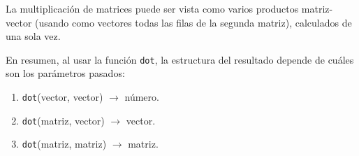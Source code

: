 \begin{frame}
La multiplicación de matrices puede ser vista como varios productos matriz-vector (usando como vectores todas las filas de la segunda matriz), calculados de una sola vez.
\end{frame}
\begin{frame}
En resumen, al usar la función \texttt{dot}, la estructura del resultado depende de cuáles son los parámetros pasados:
\begin{enumerate}[<+->]
\item \texttt{dot}(vector, vector) $\rightarrow$ número.
\item \texttt{dot}(matriz, vector) $\rightarrow$ vector.
\item \texttt{dot}(matriz, matriz) $\rightarrow$ matriz.
\end{enumerate}
\end{frame}
